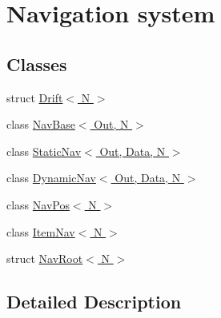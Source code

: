 \hypertarget{group__Navigation}{}\section{Navigation system}
\label{group__Navigation}
\subsection*{Classes}
\begin{DoxyCompactItemize}
\item 
struct \hyperlink{structDrift}{Drift$<$ N $>$}
\item 
class \hyperlink{classNavBase}{Nav\+Base$<$ Out, N $>$}
\item 
class \hyperlink{classStaticNav}{Static\+Nav$<$ Out, Data, N $>$}
\item 
class \hyperlink{classDynamicNav}{Dynamic\+Nav$<$ Out, Data, N $>$}
\item 
class \hyperlink{classNavPos}{Nav\+Pos$<$ N $>$}
\item 
class \hyperlink{classItemNav}{Item\+Nav$<$ N $>$}
\item 
struct \hyperlink{structNavRoot}{Nav\+Root$<$ N $>$}
\end{DoxyCompactItemize}


\subsection{Detailed Description}
